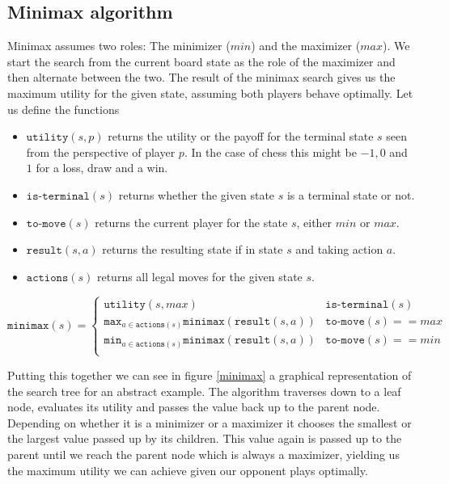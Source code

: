 \subsection{Minimax algorithm}
Minimax assumes two roles: The minimizer ($min$) and the maximizer ($max$). We start the search from the current board state as the role of the maximizer and then alternate between the two. The result of the minimax search gives us the maximum utility for the given state, assuming both players behave optimally. Let us define the functions \cite[p. 303f.]{russell_artificial_2021}
\begin{itemize}
    \item $\texttt{utility}(s, p)$ returns the utility or the payoff for the terminal state $s$ seen from the perspective of player $p$. In the case of chess this might be $-1, 0$ and $1$ for a loss, draw and a win.
    \item $\texttt{is-terminal}(s)$ returns whether the given state $s$ is a terminal state or not.
    \item $\texttt{to-move}(s)$ returns the current player for the state $s$, either $min$ or $max$.
    \item $\texttt{result}(s, a)$ returns the resulting state if in state $s$ and taking action $a$.
    \item $\texttt{actions}(s)$ returns all legal moves for the given state $s$.
\end{itemize}

\begin{equation}
    \texttt{minimax}(s) =
    \begin{cases}
        \texttt{utility}(s, max)                                                      & \texttt{is-terminal}(s)    \\
        \texttt{max}_{a\in\texttt{actions}(s)}\texttt{minimax}(\texttt{result}(s, a)) & \texttt{to-move}(s) == max \\
        \texttt{min}_{a\in\texttt{actions}(s)}\texttt{minimax}(\texttt{result}(s, a)) & \texttt{to-move}(s) == min \\
    \end{cases}
\end{equation}

Putting this together we can see in figure \ref{minimax} a graphical representation of the search tree for an abstract example. The algorithm traverses down to a leaf node, evaluates its utility and passes the value back up to the parent node. Depending on whether it is a minimizer or a maximizer it chooses the smallest or the largest value passed up by its children. This value again is passed up to the parent until we reach the parent node which is always a maximizer, yielding us the maximum utility we can achieve given our opponent plays optimally.

